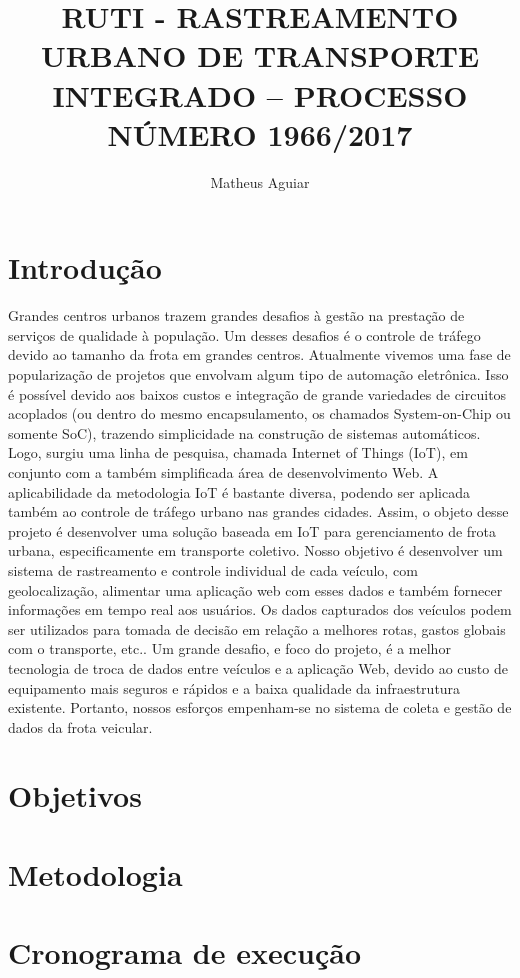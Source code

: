 \documentclass[12pt,consuni]{uftpibic}
\title{RUTI - RASTREAMENTO URBANO DE TRANSPORTE INTEGRADO – PROCESSO NÚMERO 1966/2017}
\author{Matheus Aguiar}{Fagundes}
\begin{document}
\maketitle

\chapter{Introdução}

Grandes centros urbanos trazem grandes desafios à gestão na prestação de serviços de qualidade à população. Um desses desafios é o controle de tráfego devido ao tamanho da frota em grandes centros. Atualmente vivemos uma fase de popularização de projetos que envolvam algum tipo de automação eletrônica. Isso é possível devido aos baixos custos e integração de grande variedades de circuitos acoplados (ou dentro do mesmo encapsulamento, os chamados System-on-Chip ou somente SoC), trazendo simplicidade na construção de sistemas automáticos. Logo, surgiu uma linha de pesquisa, chamada Internet of Things (IoT), em conjunto com a também simplificada área de desenvolvimento Web. A aplicabilidade da metodologia IoT é bastante diversa, podendo ser aplicada também ao controle de tráfego urbano nas grandes cidades. Assim, o objeto desse projeto é desenvolver uma solução baseada em IoT para gerenciamento de frota urbana, especificamente em transporte coletivo. Nosso objetivo é desenvolver um sistema de rastreamento e controle individual de cada veículo, com geolocalização, alimentar uma aplicação web com esses dados e também fornecer informações em tempo real aos usuários. Os dados capturados dos veículos podem ser utilizados para tomada de decisão em relação a melhores rotas, gastos globais com o transporte, etc.. Um grande desafio, e foco do projeto, é a melhor tecnologia de troca de dados entre veículos e a aplicação Web, devido ao custo de equipamento mais seguros e rápidos e a baixa qualidade da infraestrutura existente. Portanto, nossos esforços empenham-se no sistema de coleta e gestão de dados da frota veicular.

\chapter{Objetivos}


\chapter{Metodologia}



\chapter{Cronograma de execução}
\end{document}
